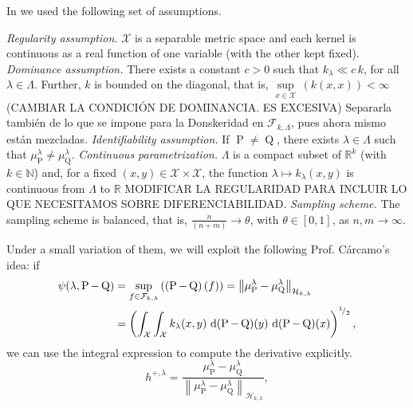 	In \textcite{Carcamo2024} we used the following set of assumptions.
	\begin{description}
		 \textit{Regularity assumption.} $\mathcal{X}$ is a separable metric space and each kernel is continuous as a real function of one variable (with the other kept fixed).
		 \textit{Dominance assumption.} There exists a constant $c>0$ such that $k_{\lambda}\ll c\,k$, for all $\lambda\in\Lambda$. Further, $k$ is bounded on the diagonal, that is, $\underset{x\in\mathcal{X}}{\operatorname{sup}}\,(k(x,x))<\infty$ {\color{orange}(CAMBIAR LA CONDICI\'{O}N DE DOMINANCIA. ES EXCESIVA) Separarla tambi\'{e}n de lo que se impone para la Donskeridad en $\mathcal{F}_{k,\Lambda}$, pues ahora mismo est\'{a}n mezcladas}.
		 \textit{Identifiability assumption.} If $\operatorname{P}\neq\operatorname{Q}$, there exists $\lambda\in\Lambda$ such that $\mu_{\operatorname{P}}^{\lambda}\neq\mu_{\operatorname{Q}}^{\lambda}$.
		 \textit{Continuous parametrization.} $\Lambda$ is a compact subset of $\mathbb{R}^{k}$ (with $k\in\mathbb{N}$) and, for a fixed $(x,y)\in\mathcal{X}\times\mathcal{X}$, the function $\lambda\mapsto k_{\lambda}(x,y)$ is continuous from $\Lambda$ to $\mathbb{R}$ {\color{orange} MODIFICAR LA REGULARIDAD PARA INCLUIR LO QUE NECESITAMOS SOBRE DIFERENCIABILIDAD}.
		 \textit{Sampling scheme.} The sampling scheme is balanced, that is, $\frac{n}{(n+m)}\to\theta$, with $\theta\in[0,1]$, as $n,m\to\infty$.
	\end{description}
	Under a small variation of them, we will exploit the following Prof. C\'{a}rcamo's idea: if
	\begin{equation}\label{Eqn:ProfCarcaIdea}
		\begin{aligned}
			\psi(\lambda,\operatorname{P}-\operatorname{Q})&=\underset{f\in\mathcal{F}_{k,\lambda}}{\operatorname{sup}}\,((\operatorname{P}-\operatorname{Q})\,(f))=\left\|\mu_{\operatorname{P}}^{\lambda}-\mu_{\operatorname{Q}}^{\lambda}\right\|_{\mathcal{H}_{k,\lambda}}
			\\&=\left(\int_{\mathcal{X}}\int_{\mathcal{X}}k_{\lambda}(x,y)\,\operatorname{d}(\operatorname{P}-\operatorname{Q})(y)\,\operatorname{d}(\operatorname{P}-\operatorname{Q})(x)\right)^{^{1}\!/_{2}},
		\end{aligned}
	\end{equation}
	we can use the integral expression to compute the derivative explicitly.
	\begin{equation}\label{Eqn:Witness}
		h^{+,\lambda}=\frac{\mu_{\operatorname{P}}^{\lambda}-\mu_{\operatorname{Q}}^{\lambda}}{\left\|\mu_{\operatorname{P}}^{\lambda}-\mu_{\operatorname{Q}}^{\lambda}\right\|_{\mathcal{H}_{k,\lambda}}},
	\end{equation}
	
